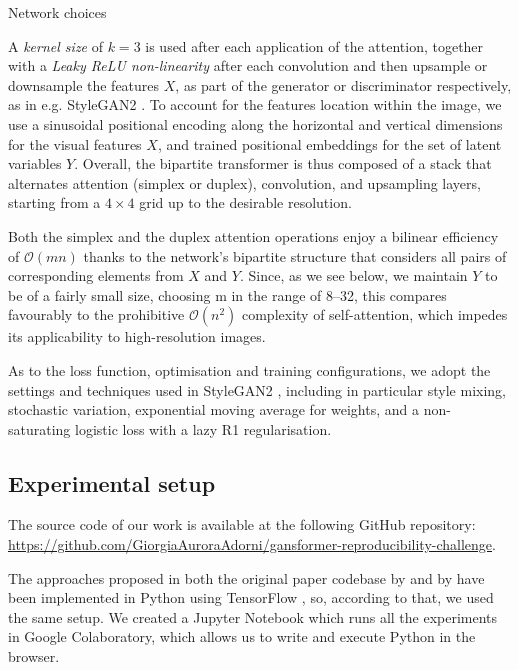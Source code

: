 \documentclass{article}
\begin{document}
	
	Network choices
	
	A \textit{kernel size} of $k = 3$ is used after each application of the attention, together with a 
	\textit{Leaky ReLU non-linearity} after each convolution and then upsample or downsample the 
	features $X$, as part of the generator or discriminator respectively, as in e.g. StyleGAN2 
	\cite{karras2020analyzing}. 
	To account for the features location within the image, we use a sinusoidal positional encoding along 
	the horizontal and vertical dimensions for the visual features $X$, and trained positional 
	embeddings for the set of latent variables $Y$.
	Overall, the bipartite transformer is thus composed of a stack that alternates attention (simplex or 
	duplex), convolution, and upsampling layers, starting from a $4 \times 4$ grid up to the desirable 
	resolution. 
	
	Both the simplex and the duplex attention operations enjoy a bilinear efficiency of 
	$\mathcal{O}(mn)$ thanks to the network’s bipartite structure that considers all pairs of 
	corresponding elements from $X$ and $Y$. Since, as we see below, we maintain $Y$ to be of a fairly 
	small size, choosing m in the range of 8–32, this compares favourably to the prohibitive 	
	$\mathcal{O}(n^2)$  complexity of self-attention, which impedes its applicability to high-resolution 
	images.
	
	As to the loss function, optimisation and training configurations, we adopt the settings and 
	techniques used in StyleGAN2 \cite{karras2020analyzing}, including in particular style mixing, 
	stochastic variation, exponential moving average for weights, and a non-saturating logistic loss with 
	a lazy R1 regularisation.
	
	\subsection{Experimental setup}	
	The source code of our work is available at the following GitHub repository: 
	\url{https://github.com/GiorgiaAuroraAdorni/gansformer-reproducibility-challenge}.
	
	The approaches proposed in both the original paper codebase by \citet{karras2020analyzing} and 
	by \citet{hudson2021generative} have been implemented in Python using TensorFlow 
	\cite{tensorflow2015-whitepaper}, so, according to that, we used the same setup.
	We created a Jupyter Notebook which runs all the experiments in Google Colaboratory, which 
	allows us to write and execute Python in the browser. 
	
\end{document}
